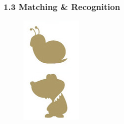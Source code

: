 \documentclass[notheorems,serif,table,compress]{beamer}  %
\begin{document}
\begin{frame}
\frametitle{1.3 Matching \& Recognition}
            \begin{figure}
              \centering
              \begin{minipage}[t]{0.2\linewidth}
              \centering
              \includegraphics[width=0.6\linewidth]{match2} 
              \end{minipage}
              \pause
              \begin{minipage}[t]{0.2\linewidth}
              \centering

\end{minipage}
\end{figure}
\end{frame}
\end{document}
